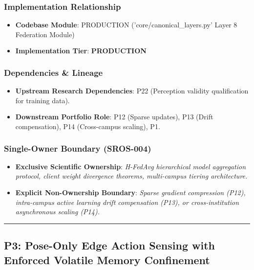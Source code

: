 \documentclass[11pt,letterpaper]{article}
\begin{document}
\subsubsection{Implementation Relationship}
\begin{itemize}[leftmargin=*]
    \item \raggedright \textbf{Codebase Module}: PRODUCTION ('core/\allowbreak canonical\_\allowbreak layers.py' Layer 8 Federation Module)
    \item \textbf{Implementation Tier}: \textbf{PRODUCTION}
\end{itemize}

\subsubsection{Dependencies \& Lineage}
\begin{itemize}[leftmargin=*]
    \item \textbf{Upstream Research Dependencies}: P22 (Perception validity qualification for training data).
    \item \textbf{Downstream Portfolio Role}: P12 (Sparse updates), P13 (Drift compensation), P14 (Cross-\allowbreak campus scaling), P1.
\end{itemize}

\subsubsection{Single-Owner Boundary (SROS-004)}
\begin{itemize}[leftmargin=*]
    \item \textbf{Exclusive Scientific Ownership}: \textit{H-\allowbreak FedAvg hierarchical model aggregation protocol, client weight divergence theorems, multi-\allowbreak campus tiering architecture.}
    \item \textbf{Explicit Non-Ownership Boundary}: \textit{Sparse gradient compression (P12), intra-\allowbreak campus active learning drift compensation (P13), or cross-\allowbreak institution asynchronous scaling (P14).}
\end{itemize}

\vspace{0.4cm}
\hrule

\subsection{P3: Pose-\allowbreak Only Edge Action Sensing with Enforced Volatile Memory Confinement}
\label{sec:profile_p3}
\end{document}
